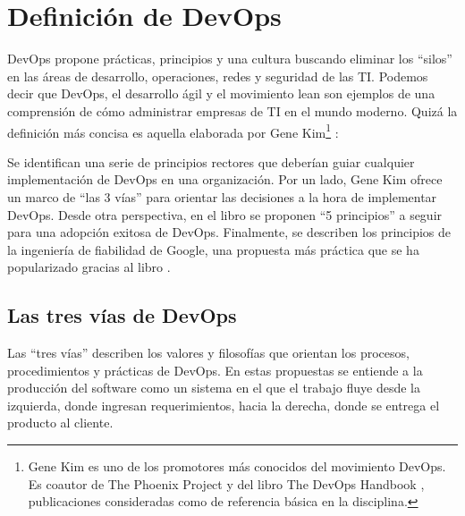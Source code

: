 \section{Definición de DevOps}

DevOps propone prácticas, principios y una cultura buscando eliminar
los ``silos'' en las áreas de desarrollo, operaciones, redes y seguridad
de las TI. Podemos decir que DevOps, el desarrollo ágil y el
movimiento lean son ejemplos de una comprensión de cómo administrar
empresas de TI en el mundo moderno. Quizá la definición más concisa es
aquella elaborada por Gene Kim\footnote{ Gene Kim es uno de los
  promotores más conocidos del movimiento DevOps. Es coautor de The
  Phoenix Project
  \cite{phoenix} y del libro
  The DevOps Handbook
  \cite{handbook},
  publicaciones consideradas como de referencia básica en la
  disciplina.}
\cite{gruver}:


Se identifican una serie de principios rectores que deberían guiar
cualquier implementación de DevOps en una organización. Por un lado,
Gene Kim ofrece un marco de ``las 3 vías''
\cite{3ways} para orientar
las decisiones a la hora de implementar DevOps. Desde otra
perspectiva, en el libro 
\cite{workbook} se proponen ``5
principios'' a seguir para una adopción exitosa de DevOps. Finalmente,
se describen los principios de la ingeniería de fiabilidad de Google,
una propuesta más práctica que se ha popularizado gracias al libro
{} \cite{sre}.

\subsection{Las tres vías de DevOps}

Las ``tres vías'' describen los valores y filosofías que orientan los
procesos, procedimientos y prácticas de DevOps. En estas propuestas se
entiende a la producción del software como un sistema en el que el
trabajo fluye desde la izquierda, donde ingresan requerimientos, hacia
la derecha, donde se entrega el producto al cliente.

